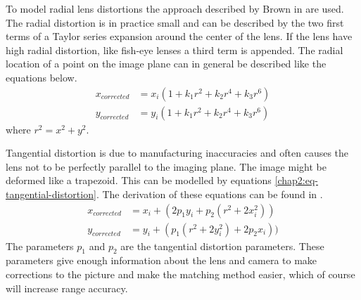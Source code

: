 To model radial lens distortions the approach described by Brown in
\cite{lens-calibration} are used. The radial distortion is in practice small and can be
described by the two first terms of a Taylor series expansion around the center of the
lens. If the lens have high radial distortion, like fish-eye lenses a third term is
appended. The radial location of a point on the image plane can in general be described
like the equations below. 
\begin{equation}
\begin{aligned}
    x_{corrected} &= x_i ( 1 + k_1 r^2 + k_2 r^4 + k_3 r^6 ) \\
    y_{corrected} &= y_i ( 1 + k_1 r^2 + k_2 r^4 + k_3 r^6 ) 
\end{aligned}
\end{equation}
where $r^2 = x^2 + y^2$.

Tangential distortion is due to manufacturing inaccuracies and often causes the lens not to be
perfectly parallel to the imaging plane. The image might be deformed like a
trapezoid. This can be modelled by equations \eqref{chap2:eq-tangential-distortion}. The
derivation of these equations can be found in \cite{brown66}.
\begin{equation}
    \label{chap2:eq-tangential-distortion}
    \begin{aligned}
        x_{corrected} &= x_i + (2 p_1 y_i + p_2 (r^2 + 2 x_i^2)) \\
        y_{corrected} &= y_i + ( p_1 (r^2 + 2 y_i^2) + 2 p_2 x_i))
    \end{aligned}
\end{equation}
The parameters $p_1$ and $p_2$ are the tangential distortion parameters. These parameters
give enough information about the lens and camera to make corrections to the picture and
make the matching method easier, which of course will increase range accuracy. 

